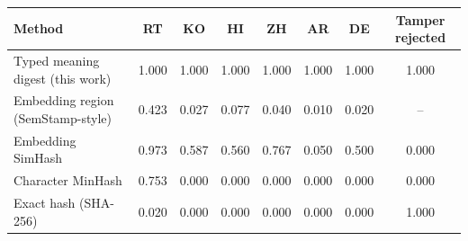 \begin{tabular}{@{}lccccccc@{}}
\toprule
Method & RT & KO & HI & ZH & AR & DE & Tamper rejected \\
\midrule
Typed meaning digest (this work) & 1.000 & 1.000 & 1.000 & 1.000 & 1.000 & 1.000 & 1.000 \\
Embedding region (SemStamp-style) & 0.423 & 0.027 & 0.077 & 0.040 & 0.010 & 0.020 & -- \\
Embedding SimHash & 0.973 & 0.587 & 0.560 & 0.767 & 0.050 & 0.500 & 0.000 \\
Character MinHash & 0.753 & 0.000 & 0.000 & 0.000 & 0.000 & 0.000 & 0.000 \\
Exact hash (SHA-256) & 0.020 & 0.000 & 0.000 & 0.000 & 0.000 & 0.000 & 1.000 \\
\bottomrule
\end{tabular}
